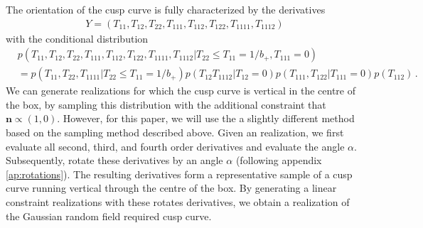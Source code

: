 \documentclass[a4paper, 11pt]{article}
\begin{document}
The orientation of the cusp curve is fully characterized by the derivatives  
\begin{align}
Y=(T_{11},T_{12},T_{22},T_{111},T_{112},T_{122},T_{1111},T_{1112})
\end{align}
with the conditional distribution
\begin{align}
&p(T_{11},T_{12},T_{22},T_{111},T_{112},T_{122},T_{1111},T_{1112}|T_{22} \leq T_{11}=1/b_+, T_{111}=0)\\
&=
p(T_{11},T_{22},T_{1111}|T_{22}\leq T_{11}=1/b_+)p(T_{12}T_{1112}|T_{12}=0)p(T_{111},T_{122}|T_{111}=0)p(T_{112})\,.
\end{align}
We can generate realizations for which the cusp curve is vertical in the centre of the box, by sampling this distribution with the additional constraint that $\bm{n} \propto (1,0)$. However, for this paper, we will use the a slightly different method based on the sampling method described above. Given an realization, we first evaluate all second, third, and fourth order derivatives and evaluate the angle $\alpha$. Subsequently, rotate these derivatives by an angle $\alpha$ (following appendix \ref{ap:rotations}). The resulting derivatives form a representative sample of a cusp curve running vertical through the centre of the box. By generating a linear constraint realizations with these rotates derivatives, we obtain a realization of the Gaussian random field required cusp curve.

%





\end{document}
